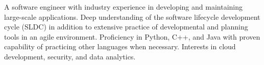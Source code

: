 

\begin{cvparagraph}

A software engineer with industry experience in developing and maintaining large-scale applications. Deep understanding of the software lifecycle development cycle (SLDC) in addition to extensive practice of developmental and planning tools in an agile environment. Proficiency in Python, C++, and Java with proven capability of practicing other languages when necessary.  Interests in cloud development, security, and data analytics.
\end{cvparagraph}